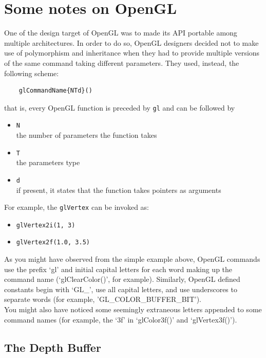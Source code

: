 \section{Some notes on OpenGL}
\label{opengl:opengl_notes}

One of the design target of OpenGL was to made its API portable 
among multiple architectures. In order to do so, OpenGL 
designers decided not to make use of polymorphism and inheritance 
when they had to provide multiple versions of the same command 
taking different parameters. They used, instead, the following scheme:

\begin{verbatim}
    glCommandName{NTd}()
\end{verbatim}

that is, every OpenGL function is preceded by \texttt{gl} and can be 
followed by

\begin{itemize}
  \item \texttt{N} \\
    the number of parameters the function takes
  \item \texttt{T} \\
    the parameters type
  \item \texttt{d} \\
    if present, it states that the function takes pointers as arguments
\end{itemize}

For example, the \texttt{glVertex} can be invoked as:

\begin{itemize}
\item \texttt{glVertex2i(1, 3)}
\item \texttt{glVertex2f(1.0, 3.5)}
\end{itemize}

As you might have observed from the simple example above,
OpenGL commands use the prefix `gl' and initial capital letters
for each word making up the command name (`glClearColor()', for
example). Similarly, OpenGL defined constants begin with `GL\_', use all
capital letters, and use underscores to separate words (for example,
'GL\_COLOR\_BUFFER\_BIT').
\\
You might also have noticed some seemingly extraneous letters appended to
some command names (for example, the `3f' in `glColor3f()' and `glVertex3f()').

\subsection{The Depth Buffer}
\label{opengl:opengl_note:depth_buffer}

